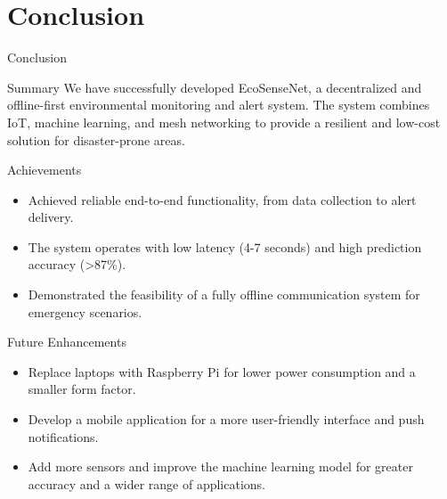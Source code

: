 \documentclass{beamer}
\begin{document}
\section{Conclusion}
\begin{frame}{Conclusion}
  \begin{block}{Summary}
    We have successfully developed EcoSenseNet, a decentralized and offline-first environmental monitoring and alert system. The system combines IoT, machine learning, and mesh networking to provide a resilient and low-cost solution for disaster-prone areas.
  \end{block}
  \begin{block}{Achievements}
    \begin{itemize}
      \item Achieved reliable end-to-end functionality, from data collection to alert delivery.
      \item The system operates with low latency (4-7 seconds) and high prediction accuracy (>87\%).
      \item Demonstrated the feasibility of a fully offline communication system for emergency scenarios.
    \end{itemize}
  \end{block}
  \begin{block}{Future Enhancements}
    \begin{itemize}
      \item Replace laptops with Raspberry Pi for lower power consumption and a smaller form factor.
      \item Develop a mobile application for a more user-friendly interface and push notifications.
      \item Add more sensors and improve the machine learning model for greater accuracy and a wider range of applications.
    \end{itemize}
  \end{block}
\end{frame}
\end{document}
